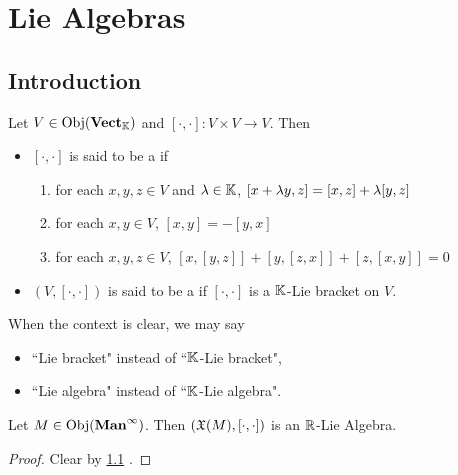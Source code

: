 \documentclass{book}
\begin{document}
\chapter{Lie Algebras}

\section{Introduction}

\begin{defn}
	Let $V \in \operatorname{Obj}(\operatorname*{\text{\textbf{Vect}}_{\mathbb{K}}})$ and $[\cdot, \cdot]: V \times V \rightarrow V$. Then 
	\begin{itemize}
		\item $[\cdot, \cdot]$ is said to be a  if 
		\begin{enumerate}
			\item {} for each $x, y, z \in V$ and $\lambda \in \mathbb{K}$, $[x + \lambda y, z] = [x, z] + \lambda [y, z]$ 
			\item {} for each $x, y \in V$, $[x, y] = -[y,x]$
			\item {} for each $x,y, z \in V$, $[x, [y,z]] + [y, [z,x]] + [z, [x,y]] = 0$
		\end{enumerate}
		\item $(V, [\cdot, \cdot])$ is said to be a  if $[\cdot, \cdot]$ is a $\mathbb{K}$-Lie bracket on $V$.
	\end{itemize}
\end{defn}

\begin{note}
	When the context is clear, we may say 
	\begin{itemize}
		\item ``Lie bracket" instead of ``$\mathbb{K}$-Lie bracket",
		\item ``Lie algebra" instead of ``$\mathbb{K}$-Lie algebra".
	\end{itemize}
\end{note}

\begin{ex}
	Let $M \in \operatorname{Obj}(\operatorname*{\text{\textbf{Man}}^{\infty}})$. Then $(\mathfrak{X}(M), [\cdot, \cdot])$ is an $\mathbb{R}$-Lie Algebra.
\end{ex}

\begin{proof}
	Clear by \ref{} .
\end{proof}
\end{document}
